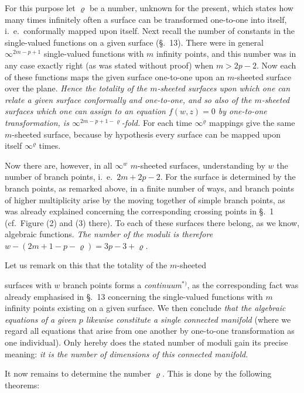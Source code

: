 \documentclass{article}
\begin{document}
For this purpose let $\varrho$ be a number, unknown for the present, which states how many times infinitely often a surface can be transformed one-to-one into itself, i.\ e.\ conformally mapped upon itself. Next recall the number of constants in the single-valued functions on a given surface (§.~13). There were in general $\infty^{2m - p + 1}$ single-valued functions with $m$ infinity points, and this number was in any case exactly right (as was stated without proof) when $m > 2p - 2$. Now each of these functions maps the given surface one-to-one upon an $m$-sheeted surface over the plane. \emph{Hence the totality of the $m$-sheeted surfaces upon which one can relate a given surface conformally and one-to-one, and so also of the $m$-sheeted surfaces which one can assign to an equation $f(w, z) = 0$ by one-to-one transformation, is $\infty^{2m - p + 1 - \varrho}$-fold.} For each time $\infty^{\varrho}$ mappings give the same $m$-sheeted surface, because by hypothesis every surface can be mapped upon itself $\infty^{\varrho}$ times.

Now there are, however, in all $\infty^{w}$ $m$-sheeted surfaces, understanding by $w$ the number of branch points, i.\ e.\ $2m + 2p - 2$. For the surface is determined by the branch points, as remarked above, in a finite number of ways, and branch points of higher multiplicity arise by the moving together of simple branch points, as was already explained concerning the corresponding crossing points in §.~1 (cf.\ Figure (2) and (3) there). To each of these surfaces there belong, as we know, algebraic functions. \emph{The number of the moduli is therefore $w - (2m + 1 - p - \varrho) = 3p - 3 + \varrho$.}

Let us remark on this that the totality of the $m$-sheeted

surfaces with $w$ branch points forms a \emph{continuum}${}^{*)}$, as the corresponding fact was already emphasised in §.~13 concerning the single-valued functions with $m$ infinity points existing on a given surface. We then conclude \emph{that the algebraic equations of a given $p$ likewise constitute a single connected manifold} (where we regard all equations that arise from one another by one-to-one transformation as one individual). Only hereby does the stated number of moduli gain its precise meaning: \emph{it is the number of dimensions of this connected manifold.}

It now remains to determine the number $\varrho$. This is done by the following theorems:
\end{document}
